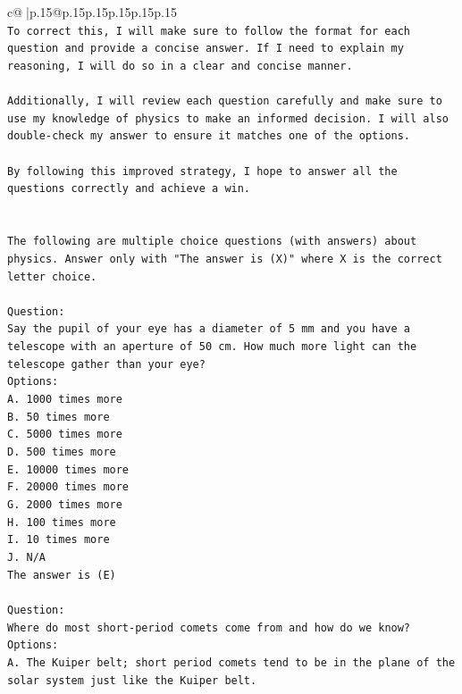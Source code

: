 \documentclass{article}
\begin{document}
{\begin{supertabular}{c@{$\;$}|p{.15\linewidth}@{}p{.15\linewidth}p{.15\linewidth}p{.15\linewidth}p{.15\linewidth}p{.15\linewidth}}
{{{\\ 
\texttt{To correct this, I will make sure to follow the format for each question and provide a concise answer. If I need to explain my reasoning, I will do so in a clear and concise manner.} \\
\\ 
\texttt{Additionally, I will review each question carefully and make sure to use my knowledge of physics to make an informed decision. I will also double{-}check my answer to ensure it matches one of the options.} \\
\\ 
\texttt{By following this improved strategy, I hope to answer all the questions correctly and achieve a win.} \\
\\ 
\\ 
\texttt{The following are multiple choice questions (with answers) about physics. Answer only with "The answer is (X)" where X is the correct letter choice.} \\
\\ 
\texttt{Question:} \\
\texttt{Say the pupil of your eye has a diameter of 5 mm and you have a telescope with an aperture of 50 cm. How much more light can the telescope gather than your eye?} \\
\texttt{Options:} \\
\texttt{A. 1000 times more} \\
\texttt{B. 50 times more} \\
\texttt{C. 5000 times more} \\
\texttt{D. 500 times more} \\
\texttt{E. 10000 times more} \\
\texttt{F. 20000 times more} \\
\texttt{G. 2000 times more} \\
\texttt{H. 100 times more} \\
\texttt{I. 10 times more} \\
\texttt{J. N/A} \\
\texttt{The answer is (E)} \\
\\ 
\texttt{Question:} \\
\texttt{Where do most short{-}period comets come from and how do we know?} \\
\texttt{Options:} \\
\texttt{A. The Kuiper belt; short period comets tend to be in the plane of the solar system just like the Kuiper belt.} \\
}}}
\end{supertabular}}
\end{document}
